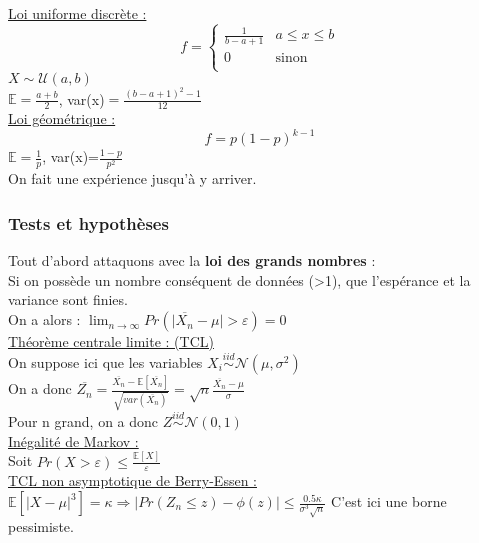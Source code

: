 \documentclass[../main.tex]{subfiles}
\begin{document}
\quad \underline{Loi uniforme discrète :}\\
\begin{equation}
    f = \left\{
    \begin{array}{cc}
        \frac{1}{b-a+1} & a\leq x\leq b \\
        0 & \textrm{sinon}\\
    \end{array}
    \right.
\end{equation}
$X\sim \mathcal{U}(a,b)$\\
$\mathbb{E} = \frac{a+b}{2}$, var(x)$=\frac{(b-a+1)^2-1}{12}$\\

\quad \underline{Loi géométrique :}\\
\begin{equation}
    f = p(1-p)^{k-1}
\end{equation}
$\mathbb{E} = \frac{1}{p}$, var(x)=$\frac{1-p}{p^2}$\\
On fait une expérience jusqu'à y arriver.\\


\subsubsection{Tests et hypothèses}
Tout d'abord attaquons avec la \textbf{loi des grands nombres} :\\
Si on possède un nombre conséquent de données (>1), que l'espérance et la variance sont finies.\\
On a alors : $\lim_{n\rightarrow \infty} Pr(\lvert \overline{X_n}-\mu \rvert > \varepsilon) = 0$\\

\quad \underline{Théorème centrale limite : (TCL)}\\
On suppose ici que les variables $X_i \stackrel{iid}{\sim} \mathcal{N}(\mu, \sigma^2)$\\
On a donc $\overline{Z_n} = \frac{\overline{X_n}-\mathbb{E}[\overline{X_n}]}{\sqrt{var(\overline{X_n})}} = \sqrt{n} \frac{\overline{X_n}-\mu}{\sigma}$\\

Pour n grand, on a donc $Z\stackrel{iid}{\sim} \mathcal{N}(0,1)$\\

\quad \underline{Inégalité de Markov :}\\
Soit $Pr(X>\varepsilon) \leq \frac{\mathbb{E}[X]}{\varepsilon}$\\

\quad \underline{TCL non asymptotique de Berry-Essen :}\\
$\mathbb{E}[\lvert X-\mu\rvert^3] = \kappa \Rightarrow \lvert Pr(Z_n \leq z) - \phi(z) \rvert \leq \frac{0.5\kappa}{\sigma^3 \sqrt{n}} $ C'est ici une borne pessimiste.\\
\end{document}
